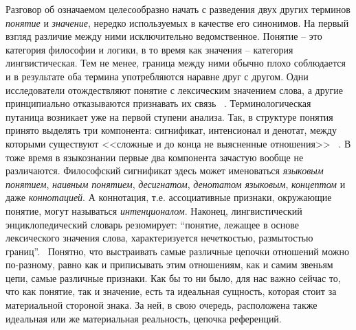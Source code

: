 Разговор об означаемом целесообразно начать с разведения двух других терминов \emph{понятие} и
\emph{значение}, нередко используемых в качестве его синонимов. На первый взгляд различие между
ними исключительно ведомственное. Понятие -- это категория философии и логики, в то время как значения --
категория лингвистическая. Тем не менее, граница между ними обычно плохо соблюдается и в
результате оба термина употребляются наравне друг с другом. Одни исследователи отождествляют
понятие с лексическим значением слова, а другие принципиально отказываются признавать их связь
~\autocite{lingvo_dictionary}. Терминологическая путаница возникает уже на первой ступени анализа.
Так, в структуре понятия принято выделять три компонента: сигнификат, интенсионал и денотат,
между которыми существуют <<сложные и до конца не выясненные отношения>>~
\autocite{lingvo_dictionary}\autocite{apresyan}\autocite{artunova}\autocite{liuis}.
В тоже время в языкознании первые два компонента зачастую вообще не различаются.
Философский сигнификат здесь может именоваться \emph{языковым понятием}, \emph{наивным понятием},
\emph{десигнатом}, \emph{денотатом языковым}, \emph{концептом} и даже \emph{коннотацией}.
А коннотация, т.е. ассоциативные признаки, окружающие понятие, могут называться \emph{интенционалом}.
Наконец, лингвистический энциклопедический словарь резюмирует: ``понятие, лежащее в основе лексического
значения слова, характеризуется нечеткостью, размытостью границ''.~\autocite{lingvo_dictionary}
Понятно, что выстраивать самые различные цепочки отношений можно по-разному,
равно как и приписывать этим отношениям, как и самим звеньям цепи, самые различные признаки.
Как бы то ни было, для нас важно сейчас то, что как понятие, так и значение,
есть та идеальная сущность, которая стоит за материальной стороной знака.
За ней, в свою очередь, расположена также идеальная или же материальная реальность,
цепочка референций.

